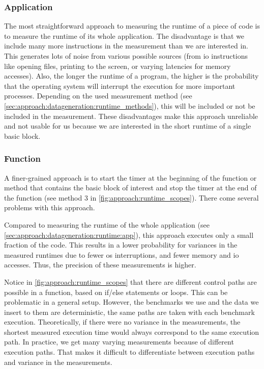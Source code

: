 \subsubsection{Application}
\tobechecked
\label{sec:approach:datageneration:runtime:app}
The most straightforward approach to measuring the runtime of a piece of code is to measure the runtime of its whole application.
The disadvantage is that we include many more instructions in the measurement than we are interested in.
This generates lots of noise from various possible sources (\eg from \ac{io} instructions like opening files, printing to the screen, or varying latencies for memory accesses).
Also, the longer the runtime of a program, the higher is the probability that the operating system will interrupt the execution for more important processes.
Depending on the used measurement method (see \cref{sec:approach:datageneration:runtime_methods}), this will be included or not be included in the measurement.
These disadvantages make this approach unreliable and not usable for us because we are interested in the short runtime of a single basic block.

\subsubsection{Function}
\tobechecked
\label{sec:approach:datageneration:runtime:function}
A finer-grained approach is to start the timer at the beginning of the function or method that contains the basic block of interest and stop the timer at the end of the function (see method 3 in \cref{fig:approach:runtime_scopes}).
There come several problems with this approach.

Compared to measuring the runtime of the whole application (see \cref{sec:approach:datageneration:runtime:app}), this approach executes only a small fraction of the code.
This results in a lower probability for variances in the measured runtimes due to fewer \ac{os} interruptions, and fewer memory and \ac{io} accesses.
Thus, the precision of these measurements is higher.

Notice in \cref{fig:approach:runtime_scopes} that there are different control paths are possible in a function, based on if/else statements or loops.
This can be problematic in a general setup.
However, the benchmarks we use and the data we insert to them are deterministic, \ie the same paths are taken with each benchmark execution.
Theoretically, if there were no variance in the measurements, the shortest measured execution time would always correspond to the same execution path.
In practice, we get many varying measurements because of different execution paths.
That makes it difficult to differentiate between execution paths and variance in the measurements.

